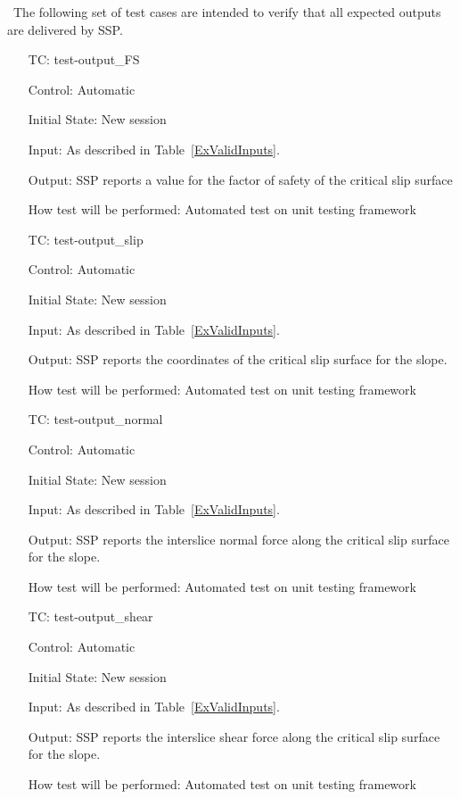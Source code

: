 \documentclass[12pt, titlepage]{article}
\newcounter{testnum} %
\newcommand{\progname}{SSP}
\begin{document}
~\newline \noindent The following set of test cases are intended to 
verify that all expected outputs are delivered by \progname{}.

\begin{enumerate}[label=TC\arabic*:,ref={\arabic*}]
	
\item [TC\refstepcounter{testnum}\thetestnum: \label{TC_OutFS}] 
test-output\_FS

Control: Automatic

Initial State: New session

Input: As described in Table~\ref{ExValidInputs}.

Output: \progname{} reports a value for the factor of safety of the critical 
slip surface

How test will be performed: Automated test on unit testing framework

\item [TC\refstepcounter{testnum}\thetestnum: \label{TC_OutSlip}] 
test-output\_slip

Control: Automatic

Initial State: New session

Input: As described in Table~\ref{ExValidInputs}.

Output: \progname{} reports the coordinates of the critical slip surface for 
the slope.

How test will be performed: Automated test on unit testing framework

\item [TC\refstepcounter{testnum}\thetestnum: \label{TC_OutNormal}] 
test-output\_normal

Control: Automatic

Initial State: New session

Input: As described in Table~\ref{ExValidInputs}.

Output: \progname{} reports the interslice normal force along the critical slip 
surface for the slope.

How test will be performed: Automated test on unit testing framework

\item [TC\refstepcounter{testnum}\thetestnum: \label{TC_OutShear}] 
test-output\_shear

Control: Automatic

Initial State: New session

Input: As described in Table~\ref{ExValidInputs}.

Output: \progname{} reports the interslice shear force along the critical slip 
surface for the slope.

How test will be performed: Automated test on unit testing framework
	
\end{enumerate}
\end{document}

